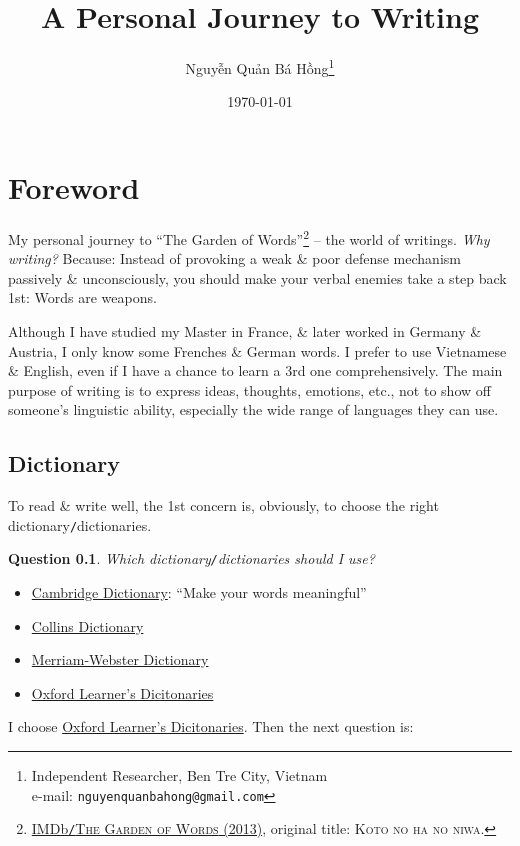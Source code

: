 \documentclass[oneside]{book}
\title{A Personal Journey to Writing}
\author{\selectlanguage{vietnamese} Nguyễn Quản Bá Hồng\footnote{Independent Researcher, Ben Tre City, Vietnam\\e-mail: \texttt{nguyenquanbahong@gmail.com}}}
\date{\today}
\numberwithin{equation}{section}
\newtheorem{question}{Question}[chapter]
\begin{document}
\maketitle
\tableofcontents


\chapter*{Foreword}
My personal journey to ``The Garden of Words''\footnote{\href{https://www.imdb.com/title/tt2591814/}{IMDb\texttt{/}\textsc{The Garden of Words} (2013)}, original title: \textsc{Koto no ha no niwa}.} -- the world of writings. \textit{Why writing?} Because: Instead of provoking a weak \& poor defense mechanism passively \& unconsciously, you should make your verbal enemies take a step back 1st: Words are weapons.

Although I have studied my Master in France, \& later worked in Germany \& Austria, I only know some Frenches \& German words. I prefer to use Vietnamese \& English, even if I have a chance to learn a 3rd one comprehensively. The main purpose of writing is to express ideas, thoughts, emotions, etc., not to show off someone's linguistic ability, especially the wide range of languages they can use.

\section{Dictionary}
To read \& write well, the 1st concern is, obviously, to choose the right dictionary\texttt{/}dictionaries.

\begin{question}
	Which dictionary\emph{\texttt{/}}dictionaries should I use?
\end{question}

\begin{itemize}
	\item \href{https://dictionary.cambridge.org/}{Cambridge Dictionary}: ``Make your words meaningful''
	\item \href{https://www.collinsdictionary.com/us/}{Collins Dictionary}
	\item \href{https://www.merriam-webster.com/}{Merriam-Webster Dictionary}
	\item \href{https://www.oxfordlearnersdictionaries.com/}{Oxford Learner's Dicitonaries}
\end{itemize}
I choose \href{https://www.oxfordlearnersdictionaries.com/}{Oxford Learner's Dicitonaries}. Then the next question is:
\end{document}
